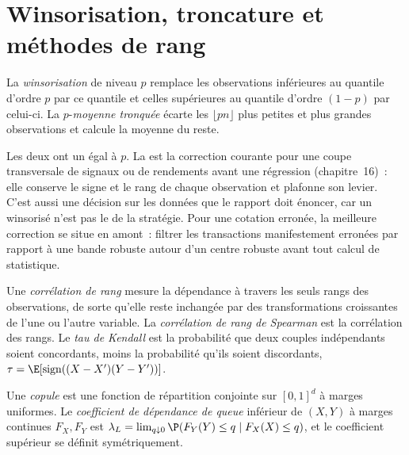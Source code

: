 \section{Winsorisation, troncature et méthodes de rang}

\begin{definition}\label{def:qm:robust-statistics-and-heavy-tails:winsor}
La \emph{winsorisation} de niveau $p$ remplace les observations inférieures au quantile d'ordre $p$ par ce quantile et celles supérieures au
quantile d'ordre $(1 - p)$ par celui-ci. La $p$-\emph{moyenne tronquée} écarte les $\lfloor pn\rfloor$ plus petites et plus grandes
observations et calcule la moyenne du reste.
\end{definition}

Les deux ont un  égal à $p$. La  est la correction courante pour une coupe transversale de signaux ou de rendements avant une régression
(chapitre~16)~: elle conserve le signe et le rang de chaque observation et plafonne son levier. C'est aussi une décision sur les données que le rapport doit
énoncer, car un  winsorisé n'est pas le  de la stratégie. Pour une cotation erronée, la meilleure correction se situe en amont~: filtrer
les transactions manifestement erronées par rapport à une bande robuste autour d'un centre robuste avant tout calcul de statistique.

\begin{definition}\label{def:qm:robust-statistics-and-heavy-tails:rank}
Une \emph{corrélation de rang} mesure la dépendance à travers les seuls rangs des observations, de sorte qu'elle reste inchangée
par des transformations croissantes de l'une ou l'autre variable. La \emph{corrélation de rang de Spearman} est la corrélation
des rangs. Le \emph{tau de Kendall} est la probabilité que deux couples indépendants soient concordants, moins la
probabilité qu'ils soient discordants, $\tau = \E[\operatorname{sign}((X - X')(Y - Y'))]$.
\end{definition}

\begin{definition}\label{def:qm:robust-statistics-and-heavy-tails:copula}
Une \emph{copule} est une fonction de répartition conjointe sur $[0, 1]^d$ à marges uniformes. Le \emph{coefficient de dépendance
de queue} inférieur de $(X, Y)$ à marges continues $F_X, F_Y$ est $\lambda_L = \lim_{q \downarrow
0}\P(F_Y(Y) \le q \mid F_X(X) \le q)$, et le coefficient supérieur se définit symétriquement.
\end{definition}

